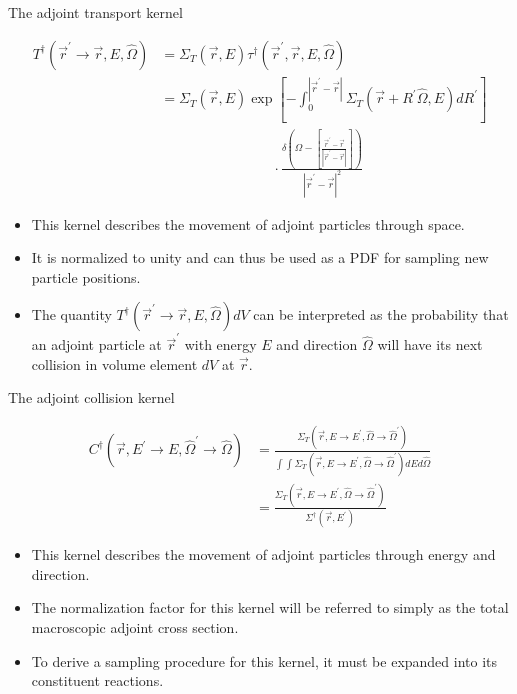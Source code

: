\documentclass{beamer}
\begin{document}
\begin{frame}{The adjoint transport kernel}

  \begin{align}
    T^{\dagger}(\vec{r}^{'} \to \vec{r},E,\hat{\Omega}) & = 
    \Sigma_T(\vec{r},E) \tau^{\dagger}(\vec{r}^{'},\vec{r},E,\hat{\Omega})
    \nonumber \\
    & = \Sigma_T(\vec{r},E) \exp{\left[-\int_0^{|\vec{r}^{'} - \vec{r}|} 
        \Sigma_T(\vec{r}+R^{'}\hat{\Omega},E)dR^{'} \right]} \nonumber \\
    & \qquad \qquad \qquad \qquad \cdot
    \frac{\delta \left(\Omega - \left[\frac{\vec{r}^{'} - \vec{r}}
        {|\vec{r}^{'} - \vec{r}|}\right]\right)}
         {|\vec{r}^{'} - \vec{r}|^2} \nonumber
  \end{align}

  \begin{itemize}
    \item This kernel describes the movement of adjoint particles through space.
    \item It is normalized to unity and can thus be used as a PDF for sampling
      new particle positions.
    \item The quantity $T^{\dagger}(\vec{r}^{'} \to \vec{r},E,\hat{\Omega})dV$ can
      be interpreted as the probability that an adjoint particle at 
      $\vec{r}^{'}$ with energy $E$ and direction $\hat{\Omega}$ will have its 
      next collision in volume element $dV$ at $\vec{r}$.
  \end{itemize}

\end{frame}

\begin{frame}{The adjoint collision kernel}

  \begin{align}
    C^{\dagger}(\vec{r},E^{'} \to E,\hat{\Omega}^{'} \to \hat{\Omega}) & = 
    \frac{\Sigma_T(\vec{r},E \to E^{'},\hat{\Omega} \to \hat{\Omega}^{'})}
         {\int\int \Sigma_T(\vec{r},E \to E^{'},\hat{\Omega} \to \hat{\Omega}^{'})
           dE d\hat{\Omega}} \nonumber \\
         & = \frac{\Sigma_T(\vec{r},E \to E^{'},\hat{\Omega} \to \hat{\Omega}^{'})}
         {\Sigma^{\dagger}(\vec{r},E^{'})} \nonumber
  \end{align}

  \begin{itemize}
    \item This kernel describes the movement of adjoint particles through 
      energy and direction.
    \item The normalization factor for this kernel will be referred to simply
      as the total macroscopic adjoint cross section.
    \item To derive a sampling procedure for this kernel, it must be expanded
      into its constituent reactions.
  \end{itemize}

\end{frame}
\end{document}
